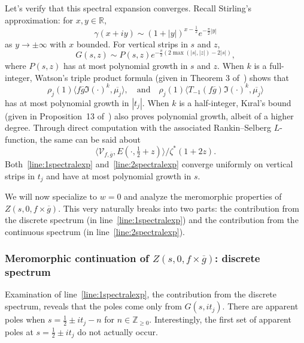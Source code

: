 \begin{remark}\label{rem:extraremark}
Let's verify that this spectral expansion converges.
Recall Stirling's approximation: for $x,y \in \mathbb{R}$,
\begin{equation}
  \gamma(x+iy) \sim (1+|y|)^{x-\frac{1}{2}}e^{-\frac{\pi}{2}|y|}
\end{equation}
as $y \to \pm\infty$ with $x$ bounded.
For vertical strips in $s$ and $z$,
\begin{equation}
  G(s,z) \sim P(s,z) e^{-\frac{\pi}{2}(2\max(|s|,|z|)-2|s|)},
\end{equation}
where $P(s,z)$ has at most polynomial growth in $s$ and $z$.
When $k$ is a full-integer, Watson's triple product formula (given in Theorem 3
of~\cite{watson2008rankin}) shows that
\begin{equation}
  \rho_j(1)\langle f\overline{g} \Im(\cdot)^k,\overline{\mu_j}\rangle, \quad \text{and}
  \quad  \rho_j(1)\langle T_{-1}(f\overline{g}) \Im(\cdot)^k,\overline{\mu_j}\rangle
\end{equation}
has at most polynomial growth in $|t_j|$.
When $k$ is a half-integer, K\i{}ral's bound (given in Proposition~13
of~\cite{mehmet2015}) also proves polynomial growth, albeit of a higher degree.
Through direct computation with the associated Rankin--Selberg $L$-function, %
the same can be said about
\begin{equation}
  \langle \mathcal{V}_{f,\overline{g} }, E(\cdot,\tfrac{1}{2}+z)\rangle / \zeta^*(1+2z).
\end{equation}
Both~\eqref{line:1spectralexp} and~\eqref{line:2spectralexp} converge uniformly on
vertical strips in $t_j$ and have at most polynomial growth in $s$.
\end{remark}


We will now specialize to $w = 0$ and analyze the meromorphic properties of $Z(s, 0,
f\times \overline{g})$.
This very naturally breaks into two parts: the contribution from the discrete spectrum (in
line~\eqref{line:1spectralexp}) and the contribution from the continuous spectrum (in
line~\eqref{line:2spectralexp}).


\subsubsection{Meromorphic continuation of $Z(s, 0, f\times \overline{g})$: discrete spectrum}


Examination of line~\eqref{line:1spectralexp}, the contribution from the discrete
spectrum, reveals that the poles come only from $G(s, it_j)$.
There are apparent poles when $s = \tfrac{1}{2} \pm it_j - n$ for $n \in \mathbb{Z}_{\geq
0}$.
Interestingly, the first set of apparent poles at $s = \frac{1}{2} \pm it_j$ do not
actually occur.


